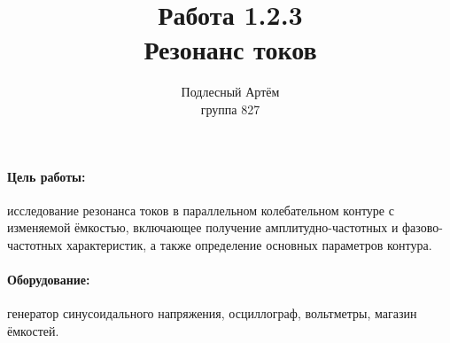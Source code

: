 \documentclass[a4paper, 12pt]{article}%
\author{Подлесный Артём \\ группа 827}
\title{ Работа 1.2.3 \\ Резонанс токов}
\begin{document}
\maketitle
\paragraph*{Цель работы:}исследование резонанса токов в параллельном колебательном контуре с изменяемой
ёмкостью, включающее получение амплитудно-частотных и фазово-частотных характеристик, а также определение основных параметров контура.


\paragraph*{Оборудование:}
генератор синусоидального напряжения, осциллограф, вольтметры, магазин ёмкостей.
\end{document}
